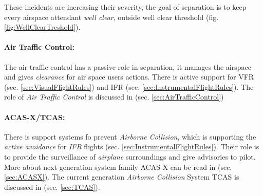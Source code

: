 \noindent These incidents are increasing their severity, the goal of separation is to keep every airspace attendant \emph{well clear}, outside well clear threshold (fig. \ref{fig:WellClearTreshold}). 
\paragraph{Air Traffic Control:} The air traffic control has a passive role in separation, it manages the airspace and gives \emph{clearance} for air space users actions. There is active support for VFR (sec. \ref{sec:VisualFlightRules}) and IFR (sec. \ref{sec:InstrumentalFlightRules}). The role of \emph{Air Traffic Control} is discussed in (sec. \ref{sec:AirTrafficControl})

\paragraph{ACAS-X/TCAS:} There is support systems fo prevent \emph{Airborne Collision}, which is supporting the \emph{active avoidance} for \emph{IFR} flights (sec. \ref{sec:InstrumentalFlightRules}). Their role is to provide the surveillance of \emph{airplane} surroundings and give advisories to pilot. More about next-generation system family ACAS-X can be read in (sec. \ref{sec:ACASX}). The current generation \emph{Airborne Collision} System TCAS is discussed in (sec. \ref{sec:TCAS}).

